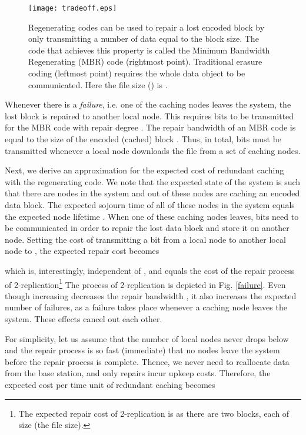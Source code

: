 \documentclass[10pt,conference]{IEEEtran}
\begin{document}
\begin{figure}[tb]
\centering \texttt{[image: tradeoff.eps]}
\caption{Regenerating codes can be used to repair a lost encoded block by only transmitting a number of data equal to the block size. The code that achieves this property is called the Minimum Bandwidth Regenerating (MBR) code (rightmost point). Traditional erasure coding (leftmost point) requires the whole data object to be communicated. Here the file size () is .}
\label{tradeoff}
\end{figure}

Whenever there is a \emph{failure}, i.e. one of the caching nodes
leaves the system, the lost block is repaired to another local node.
This requires  bits to be transmitted
for the MBR code with repair degree  \cite{dima}. The repair
bandwidth of an MBR code is equal to the size of the encoded (cached)
block . Thus, in total,  bits must be transmitted whenever a local node
downloads the file from a set of  caching nodes.

Next, we derive an approximation for the expected cost of redundant
caching with the  regenerating code. We note that the
expected state of the system is such that there are  nodes in the
system and  out of these  nodes are caching an encoded data
block. The expected sojourn time of all of these  nodes in the system
equals the expected node lifetime . When one of these caching nodes
leaves,  bits need to be communicated in
order to repair the lost data block and store it on another node. Setting the cost of transmitting a bit from a local node to another local node
to , the expected repair cost becomes

which is, interestingly, independent of , and equals the cost of
the repair process of 2-replication\footnote{The expected repair cost of 2-replication is  as there are two blocks, each of size  (the file size).} 
The process of 2-replication is depicted in Fig. \ref{failure}. Even
though increasing  decreases the repair bandwidth , it also
increases the expected number of failures, as a failure takes place
whenever a caching node leaves the system. These effects cancel out each other.

For simplicity, let us assume that the number of local nodes never drops below  and the repair process is so fast (immediate) that no nodes leave the system before the repair process is complete. Thence, we never need to reallocate data from the base station, and only repairs incur upkeep costs. Therefore, the expected cost per time unit of redundant caching becomes
\end{document}
